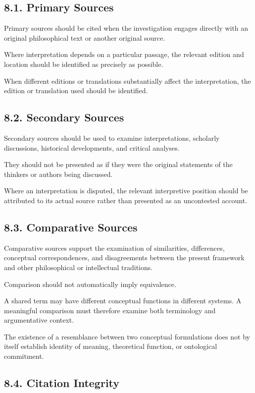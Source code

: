 \subsection*{8.1. Primary Sources}

Primary sources should be cited when the
investigation engages directly with an original
philosophical text or another original source.

Where interpretation depends on a particular
passage, the relevant edition and location
should be identified as precisely as possible.

When different editions or translations
substantially affect the interpretation,
the edition or translation used should be
identified.

\subsection*{8.2. Secondary Sources}

Secondary sources should be used to examine
interpretations, scholarly discussions,
historical developments, and critical analyses.

They should not be presented as if they were
the original statements of the thinkers or
authors being discussed.

Where an interpretation is disputed, the
relevant interpretive position should be
attributed to its actual source rather than
presented as an uncontested account.

\subsection*{8.3. Comparative Sources}

Comparative sources support the examination
of similarities, differences, conceptual
correspondences, and disagreements between
the present framework and other philosophical
or intellectual traditions.

Comparison should not automatically imply
equivalence.

A shared term may have different conceptual
functions in different systems. A meaningful
comparison must therefore examine both
terminology and argumentative context.

The existence of a resemblance between two
conceptual formulations does not by itself
establish identity of meaning, theoretical
function, or ontological commitment.

\subsection*{8.4. Citation Integrity}

